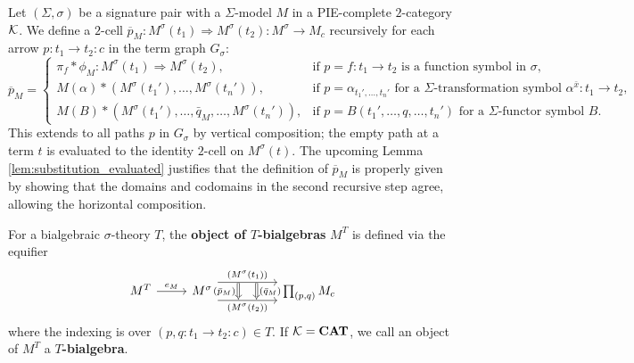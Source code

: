 \begin{definition}\label{def:objectOfTBialgebras}
   Let $(\Sigma,\sigma)$ be a signature pair with a $\Sigma$-model $M$ in a PIE-complete $2$-category $\mathcal{K}$. We define a $2$-cell $\overline{p}_M \colon M^\sigma(t_1) \Rightarrow M^\sigma(t_2) \colon M^\sigma \to M_c$ recursively for each arrow $p \colon t_1 \to t_2 \colon c$ in the term graph $G_\sigma$:
   {\footnotesize
   \[
   \overline{p}_M = \begin{cases}
       \pi_f * \phi_M \colon M^\sigma(t_1) \Rightarrow M^\sigma(t_2), & \text{if $p = f \colon t_1 \to t_2$ is a function symbol in $\sigma$,} \\
       M(\alpha) * (M^\sigma(t_1'), \dots, M^{\sigma}(t_n')), & \text{if $p = \alpha_{t_1', \dots, t_n'}$ for a $\Sigma$-transformation symbol $\alpha^{\bar{x}}\colon t_1\to t_2$,} \\
       M(B) * (M^\sigma(t_1'), \dots, \bar{q}_M, \dots, M^\sigma(t_n')), & \text{if $p = B(t_1', \dots, q, \dots, t_n')$ for a $\Sigma$-functor symbol $B$.}
   \end{cases}
   \]
   }
   This extends to all paths $p$ in $G_\sigma$ by vertical composition; the empty path at a term $t$ is evaluated to the identity $2$-cell on $M^\sigma(t)$. The upcoming Lemma \ref{lem:substitution_evaluated} justifies that the definition of $\overline{p}_M$ is properly given by showing that the domains and codomains in the second recursive step agree, allowing the horizontal composition. 


   For a bialgebraic $\sigma$-theory $T$, the \textbf{object of $T$-bialgebras} $M^T$ is defined via the equifier
   \[
       \begin{tikzcd}[ampersand replacement=\&]
{M^T} \& {M^\sigma} \&\& {\prod_{(p,q)} M_c}
\arrow["{e_M}", from=1-1, to=1-2]
\arrow[""{name=0, anchor=center, inner sep=0}, "{(M^\sigma(t_1))}", shift left=3, from=1-2, to=1-4]
\arrow[""{name=1, anchor=center, inner sep=0}, "{(M^\sigma(t_2))}"', shift right=3, from=1-2, to=1-4]
\arrow["{(\bar{p}_M)}"', shift right=3, Rightarrow, from=0, to=1]
\arrow["{(\bar{q}_M)}", shift left=3, Rightarrow, from=0, to=1]
\end{tikzcd}
   \]
   where the indexing is over $(p,q\colon t_1\to t_2\colon c)\in T$. If $\mathcal{K} = \mathbf{CAT}$, we call an object of $M^T$ a \textbf{$T$-bialgebra}.
\end{definition}

